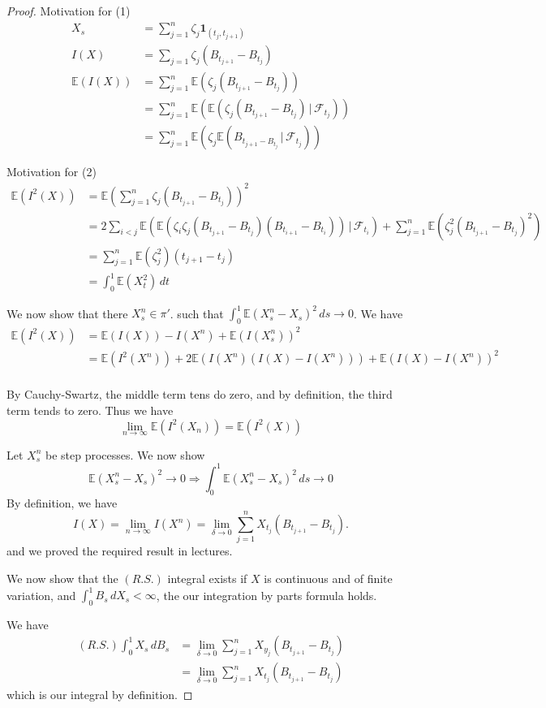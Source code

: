 \documentclass[10pt, oneside, reqno]{amsart}
\theoremstyle{plain}%
\theoremstyle{definition}
\theoremstyle{remark}
\newcommand{\E}{\mathbb{E}}
\newcommand{\sigf}{\mathcal{F}}
\begin{document}
\begin{proof}
	Motivation for (1)
	\begin{align*}
		X_s &= \sum_{j=1}^n \zeta_j \mathbf{1}_{(t_j, t_{j+1})} \\
		I(X) &= \sum_{j=1} \zeta_j (B_{t_{j+1}} - B_{t_j}) \\
		\E(I(X)) &= \sum_{j=1}^n \E(\zeta_j (B_{t_{j+1}} - B_{t_j})) \\
					&= \sum_{j=1}^n \E(\E(\zeta_j (B_{t_{j+1}} - B_{t_j})\, | \, \sigf_{t_j})) \\
					&= \sum_{j=1}^n \E(\zeta_j  \E(B_{t_{j+1} - B_{t_j}} \, | \, \sigf_{t_j}))  
	\end{align*}
	
	Motivation for (2)
	\begin{align*}
		\E( I^2(X)) &= \E(\sum_{j=1}^n \zeta_j (B_{t_{j+1}} - B_{t_j}))^2 \\
					&= 2 \sum_{i < j} \E(\E( \zeta_i \zeta_j (B_{t_{j+1}} - B_{t_j})(B_{t_{i+1}} - B_{t_i})) \, | \, \sigf_{t_i} ) + \sum_{j=1}^n \E(\zeta_j^2 (B_{t_{j+1}} - B_{t_{j}})^2 )  \\
					&= \sum_{j=1}^n \E(\zeta_j^2) (t_{j+1} - t_{j}) \\
					&= \int_0^1 \E(X_t^2) \, dt				
	\end{align*}
	
	We now show that there $X_s^n \in \pi'$.  such that $\int_0^1 \E(X_s^n - X_s)^2 \, ds \rightarrow 0$.  We have \begin{align*}
		\E(I^2(X)) &= \E(I(X)) - I(X^n) + \E(I(X^n_s))^2 \\
				&= \E(I^2(X^n)) + 2 \E(I(X^n)(I(X) - I(X^n)) ) + \E(I(X) - I(X^n))^2 \\ 
	\end{align*}
	
	By Cauchy-Swartz, the middle term tens do zero, and by definition, the third term tends to zero.  Thus we have 
	\[
		\lim_{n \rightarrow \infty} \E(I^2(X_n)) = \E(I^2(X))
	\]
	
	Let $X_s^n$ be step processes.  We now show \[
		\E(X_s^n - X_s)^2 \rightarrow 0 \Rightarrow \int_0^1 \E(X_s^n - X_s)^2 \, ds \rightarrow 0
	\] 
	By definition, we have \[
		I(X) = \lim_{n \rightarrow \infty} I(X^n) = \lim_{\delta \rightarrow 0} \sum_{j=1}^n X_{t_j} (B_{t_{j+1}} - B_{t_j}).  
	\] and we proved the required result in lectures.
	
	We now show that the $(R.S.)$ integral exists if $X$ is continuous and of finite variation, and $\int_0^1 B_s \, dX_s < \infty$, the our integration by parts formula holds.
	
	  We have 
	\begin{align*}
		(R.S.) \int_0^1 X_s \, dB_s &= \lim_{\delta \rightarrow 0} \sum_{j=1}^n X_{y_j} (B_{t_{j+1}} - B_{t_j}) \\
		&= \lim_{\delta \rightarrow 0} \sum_{j=1}^n X_{t_j}  (B_{t_{j+1}} - B_{t_j})
	\end{align*} 
	which is our \ito integral by definition.
	
 \end{proof}
\end{document}
